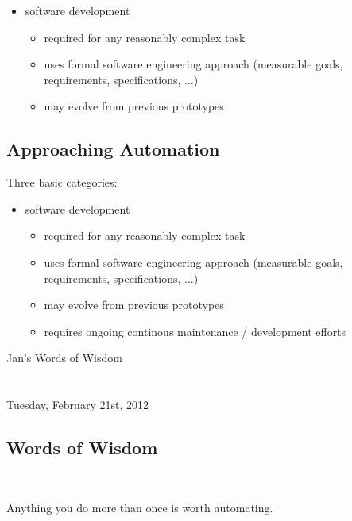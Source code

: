 \documentclass[xga]{xdvislides}
\begin{document}
\begin{itemize}
	\item software development
		\begin{itemize}
			\item required for any reasonably complex task
			\item uses formal software engineering approach (measurable goals,
				requirements, specifications, ...)
			\item may evolve from previous prototypes
		\end{itemize}
\end{itemize}


\subsection{Approaching Automation}
Three basic categories:
\\

\begin{itemize}
	\item software development
		\begin{itemize}
			\item required for any reasonably complex task
			\item uses formal software engineering approach (measurable goals,
				requirements, specifications, ...)
			\item may evolve from previous prototypes
			\item requires ongoing continous maintenance / development efforts
		\end{itemize}
\end{itemize}


\newpage
\vspace*{\fill}
\begin{center}
	\Hugesize
		Jan's Words of Wisdom \\ [1em]
	\hspace*{5mm}
	\blueline\\
	\hspace*{5mm}\\
		Tuesday, February 21st, 2012
\end{center}
\vspace*{\fill}

\subsection{Words of Wisdom}
\\

\newcommand{\gargantuan}{\fontsize{70}{75}\selectfont}
\gargantuan
\begin{center}
Anything you do more than once is worth automating.
\end{center}
\Normalsize
\end{document}
